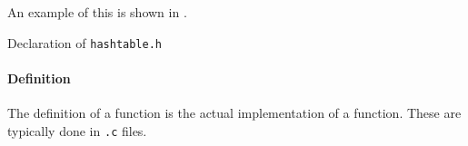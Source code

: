 An example of this is shown in .

\begin{listing}[h!tbp]
\caption{Declaration of \texttt{hashtable.h}}
\label{lst:Function_Declaration_hashtable}
\end{listing}

\paragraph{Definition}\label{par:Function_Definition}
The definition of a function is the actual implementation of a function.
These are typically done in \texttt{.c} files.


